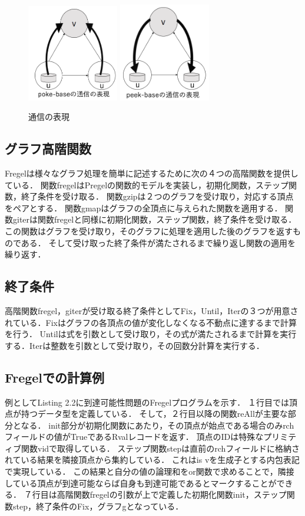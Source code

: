 \documentclass[12pt]{ujreport}
\begin{document}
\begin{figure}[ht]
  \centering
  \includegraphics[width=4cm]{pokebase.png}
  \includegraphics[width=4cm]{peekbase.png}
\caption{通信の表現}
\end{figure}

\subsection{グラフ高階関数}
Fregelは様々なグラフ処理を簡単に記述するために次の４つの高階関数を提供している．
関数fregelはPregelの関数的モデルを実装し，初期化関数，ステップ関数，終了条件を受け取る．
関数gzipは２つのグラフを受け取り，対応する頂点をペアとする．
関数gmapはグラフの全頂点に与えられた関数を適用する．
関数giterは関数fregelと同様に初期化関数，ステップ関数，終了条件を受け取る．
この関数はグラフを受け取り，そのグラフに処理を適用した後のグラフを返すものである．
そして受け取った終了条件が満たされるまで繰り返し関数の適用を繰り返す．

\subsection{終了条件}
高階関数fregel，giterが受け取る終了条件としてFix，Until，Iterの３つが用意されている．Fixはグラフの各頂点の値が変化しなくなる不動点に達するまで計算を行う．
Untilは式を引数として受け取り，その式が満たされるまで計算を実行する．Iterは整数を引数として受け取り，その回数分計算を実行する．

\subsection{Fregelでの計算例}
例としてListing 2.2に到達可能性問題のFregelプログラムを示す．
１行目では頂点が持つデータ型を定義している．
そして，２行目以降の関数reAllが主要な部分となる．
init部分が初期化関数にあたり，その頂点が始点である場合のみrchフィールドの値がTrueであるRvalレコードを返す．
頂点のIDは特殊なプリミティブ関数vidで取得している．
ステップ関数stepは直前のrchフィールドに格納されている結果を隣接頂点から集約している．
これはis vを生成子とする内包表記で実現している．
この結果と自分の値の論理和をor関数で求めることで，隣接している頂点が到達可能ならば自身も到達可能であるとマークすることができる．
７行目は高階関数fregelの引数が上で定義した初期化関数init，ステップ関数step，終了条件のFix，グラフgとなっている．
\end{document}
